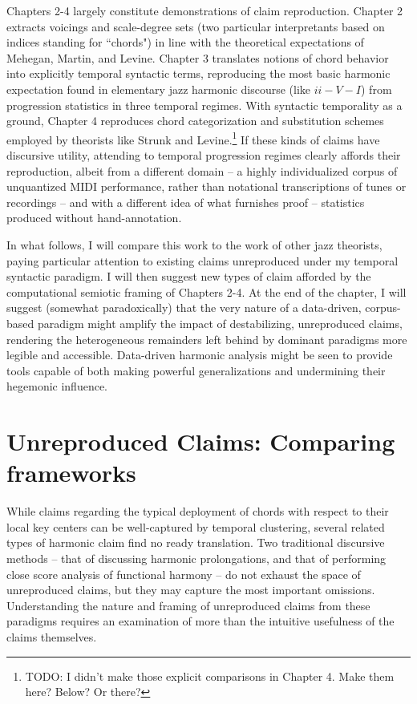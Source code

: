 Chapters 2-4 largely constitute demonstrations of claim reproduction.  Chapter 2 extracts voicings and scale-degree sets (two particular interpretants based on indices standing for ``chords") in line with the theoretical expectations of Mehegan, Martin, and Levine.  Chapter 3 translates notions of chord behavior into explicitly temporal syntactic terms, reproducing the most basic harmonic expectation found in elementary jazz harmonic discourse (like $ii - V - I$) from progression statistics in three temporal regimes.  With syntactic temporality as a ground, Chapter 4 reproduces chord categorization and substitution schemes employed by theorists like Strunk and Levine.\footnote{TODO: I didn't make those explicit comparisons in Chapter 4.  Make them here?  Below?  Or there?}  If these kinds of claims have discursive utility, attending to temporal progression regimes clearly affords their reproduction, albeit from a different domain -- a highly individualized corpus of unquantized MIDI performance, rather than notational transcriptions of tunes or recordings -- and with a different idea of what furnishes proof -- statistics produced without hand-annotation.

In what follows, I will compare this work to the work of other jazz theorists, paying particular attention to existing claims unreproduced under my temporal syntactic paradigm.  I will then suggest new types of claim afforded by the computational semiotic framing of Chapters 2-4.  At the end of the chapter, I will suggest (somewhat paradoxically) that the very nature of a data-driven, corpus-based paradigm might amplify the impact of destabilizing, unreproduced claims, rendering the heterogeneous remainders left behind by dominant paradigms more legible and accessible.  Data-driven harmonic analysis might be seen to provide tools capable of both making powerful generalizations and undermining their hegemonic influence.

\section{Unreproduced Claims: Comparing frameworks}

While claims regarding the typical deployment of chords with respect to their local key centers can be well-captured by temporal clustering, several related types of harmonic claim find no ready translation.  Two traditional discursive methods -- that of discussing harmonic prolongations, and that of performing close score analysis of functional harmony -- do not exhaust the space of unreproduced claims, but they may capture the most important omissions.  Understanding the nature and framing of unreproduced claims from these paradigms requires an examination of more than the intuitive usefulness of the claims themselves.

